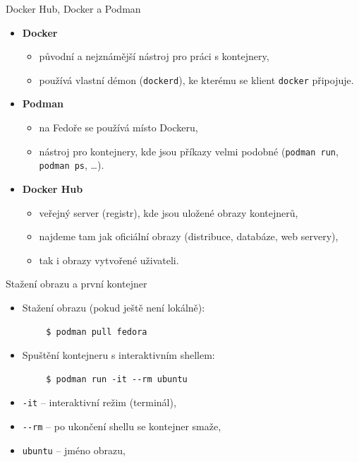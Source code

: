 \documentclass{beamer}
\begin{document}
\begin{frame}{Docker Hub, Docker a Podman}
	\begin{itemize}
		\item \textbf{Docker}
		\begin{itemize}
			\item původní a nejznámější nástroj pro práci s kontejnery,
			\item používá vlastní démon (\texttt{dockerd}), ke kterému se klient \texttt{docker} připojuje.
		\end{itemize}
		
		\item \textbf{Podman}
		\begin{itemize}
			\item na Fedoře se používá místo Dockeru,
			\item nástroj pro kontejnery, kde jsou příkazy velmi podobné (\texttt{podman run}, \texttt{podman ps}, \dots).

		\end{itemize}
		
		\item \textbf{Docker Hub}
		\begin{itemize}
			\item veřejný server (registr), kde jsou uložené obrazy kontejnerů,
			\item najdeme tam jak oficiální obrazy (distribuce, databáze, web servery),
			\item tak i obrazy vytvořené uživateli.
		\end{itemize}

	\end{itemize}
\end{frame}

\begin{frame}[fragile]{Stažení obrazu a první kontejner}
	\begin{itemize}
		\item Stažení obrazu (pokud ještě není lokálně):
	\end{itemize}
	\begin{verbatim}
		$ podman pull fedora
	\end{verbatim}
	
	\begin{itemize}
		\item Spuštění kontejneru s interaktivním shellem:
	\end{itemize}
	\begin{verbatim}
		$ podman run -it --rm ubuntu
	\end{verbatim}
	
	\begin{itemize}
		\item \texttt{-it} – interaktivní režim (terminál),
		\item \texttt{-{}-rm} – po ukončení shellu se kontejner smaže,
		\item \texttt{ubuntu} – jméno obrazu,
	\end{itemize}
\end{frame}
\end{document}
